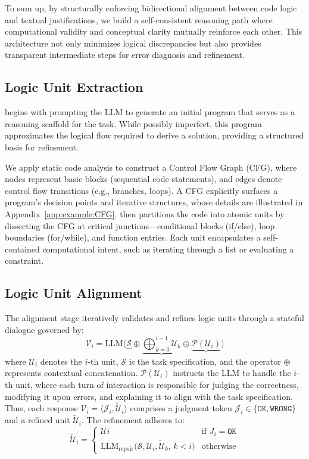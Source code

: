 To sum up, by structurally enforcing bidirectional alignment between code logic and textual justifications, we build a self-consistent reasoning path where computational validity and conceptual clarity mutually reinforce each other. This architecture not only minimizes logical discrepancies but also provides transparent intermediate steps for error diagnosis and refinement.

\subsection{Logic Unit Extraction}
\tool begins with prompting the LLM to generate an initial program that serves as a reasoning scaffold for the task. While possibly imperfect, this program approximates the logical flow required to derive a solution, providing a structured basis for refinement.

We apply static code analysis to construct a Control Flow Graph (CFG), where nodes represent basic blocks (sequential code statements), and edges denote control flow transitions (e.g., branches, loops). 
A CFG explicitly surfaces a program’s decision points and iterative structures, whose details are illustrated in Appendix~\ref{app:example:CFG}.
\tool then partitions the code into atomic units by dissecting the CFG at critical junctions—conditional blocks (if/else), loop boundaries (for/while), and function entries. Each unit encapsulates a self-contained computational intent, such as iterating through a list or evaluating a constraint.


\subsection{Logic Unit Alignment}
The alignment stage iteratively validates and refines logic units through a stateful dialogue governed by:
%
\begin{equation}
\mathcal{V}_i = \text{LLM}\Big(\underbrace{\mathcal{S}} \oplus \underbrace{\bigoplus_{k=0}^{i-1} \mathcal{U}_k} \oplus \underbrace{\mathcal{P}(\mathcal{U}_i)}\Big)
\end{equation}
%
where $\mathcal{U}_i$ denotes the $i$-th unit, $\mathcal{S}$ is the task specification, and the operator $\oplus$ represents contextual concatenation.
$\mathcal{P}(\mathcal{U}_i)$ instructs the LLM to handle the $i$-th unit, where each turn of interaction is responsible for judging the correctness, modifying it upon errors, and explaining it to align with the task specification.
%
Thus, each response $\mathcal{V}_i = \langle \mathcal{J}_i, \widetilde{\mathcal{U}}_i \rangle$ comprises a judgment token $\mathcal{J}_i \in \{\texttt{OK}, \texttt{WRONG}\}$ and a refined unit $\widetilde{\mathcal{U}}_i$.
The refinement adheres to:
%
\begin{equation}
\tilde{\mathcal{U}}_i = \begin{cases}
\mathcal{U}i & \text{if } J_i = \texttt{OK} \\
\text{LLM}_{\text{repair}}\big(\mathcal{S}, \mathcal{U}_i, {\tilde{\mathcal{U}}_k},\, {k < i}\big) & \text{otherwise}
\end{cases}
\end{equation}

